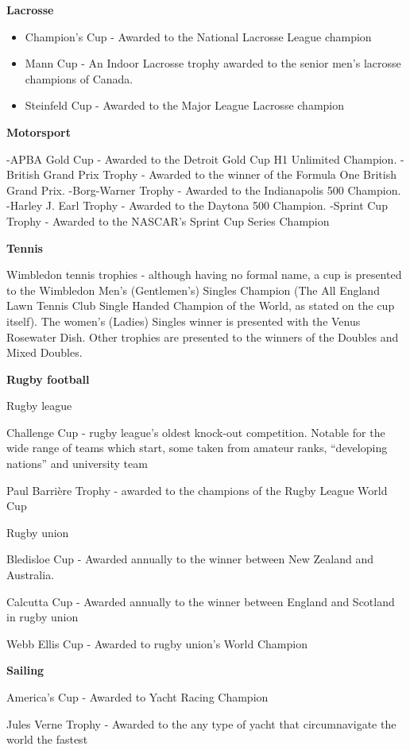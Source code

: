\documentclass[
  openany]{book}
\providecommand{\tightlist}{%
  \setlength{\itemsep}{0pt}\setlength{\parskip}{0pt}}
\begin{document}
\textbf{Lacrosse}

\begin{itemize}
\tightlist
\item
  Champion's Cup - Awarded to the National Lacrosse League champion
\item
  Mann Cup - An Indoor Lacrosse trophy awarded to the senior men's lacrosse champions of Canada.
\item
  Steinfeld Cup - Awarded to the Major League Lacrosse champion
\end{itemize}

\textbf{Motorsport}

-APBA Gold Cup - Awarded to the Detroit Gold Cup H1 Unlimited Champion.
-British Grand Prix Trophy - Awarded to the winner of the Formula One British Grand Prix.
-Borg-Warner Trophy - Awarded to the Indianapolis 500 Champion.
-Harley J. Earl Trophy - Awarded to the Daytona 500 Champion.
-Sprint Cup Trophy - Awarded to the NASCAR's Sprint Cup Series Champion

\textbf{Tennis}

Wimbledon tennis trophies - although having no formal name, a cup is presented to the Wimbledon Men's (Gentlemen's) Singles Champion (The All England Lawn Tennis Club Single Handed Champion of the World, as stated on the cup itself). The women's (Ladies) Singles winner is presented with the Venus Rosewater Dish. Other trophies are presented to the winners of the Doubles and Mixed Doubles.

\textbf{Rugby football}

Rugby league

Challenge Cup - rugby league's oldest knock-out competition. Notable for the wide range of teams which start, some taken from amateur ranks, ``developing nations'' and university team

Paul Barrière Trophy - awarded to the champions of the Rugby League World Cup

Rugby union

Bledisloe Cup - Awarded annually to the winner between New Zealand and Australia.

Calcutta Cup - Awarded annually to the winner between England and Scotland in rugby union

Webb Ellis Cup - Awarded to rugby union's World Champion

\textbf{Sailing}

America's Cup - Awarded to Yacht Racing Champion

Jules Verne Trophy - Awarded to the any type of yacht that circumnavigate the world the fastest
\end{document}
